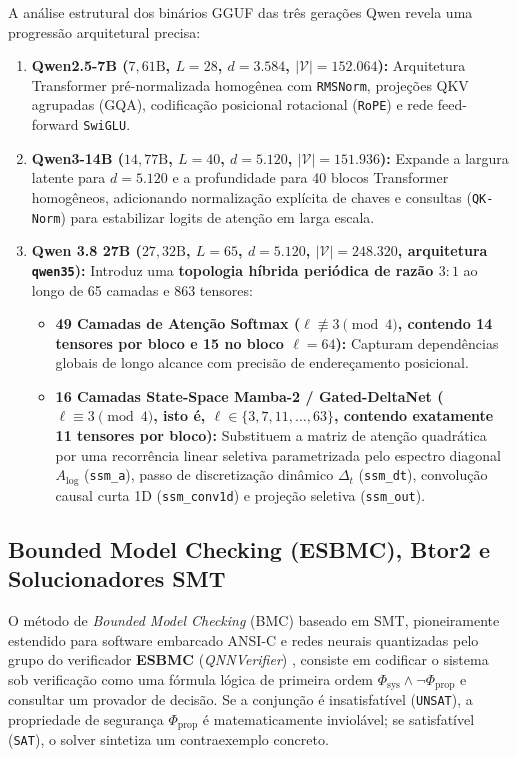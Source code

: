 \documentclass[11pt,a4paper]{article}
\theoremstyle{definition}
\begin{document}
A análise estrutural dos binários GGUF das três gerações Qwen revela uma progressão arquitetural precisa:
\begin{enumerate}
    \item \textbf{Qwen2.5-7B ($7{,}61\text{B}$, $L=28$, $d=3.584$, $|\mathcal{V}|=152.064$):} Arquitetura Transformer pré-normalizada homogênea com \texttt{RMSNorm}, projeções QKV agrupadas (GQA), codificação posicional rotacional (\texttt{RoPE}) e rede feed-forward \texttt{SwiGLU}.
    \item \textbf{Qwen3-14B ($14{,}77\text{B}$, $L=40$, $d=5.120$, $|\mathcal{V}|=151.936$):} Expande a largura latente para $d = 5.120$ e a profundidade para 40 blocos Transformer homogêneos, adicionando normalização explícita de chaves e consultas (\texttt{QK-Norm}) para estabilizar logits de atenção em larga escala.
    \item \textbf{Qwen 3.8 27B ($27{,}32\text{B}$, $L=65$, $d=5.120$, $|\mathcal{V}|=248.320$, arquitetura \texttt{qwen35}):} Introduz uma \textbf{topologia híbrida periódica de razão $3:1$} ao longo de 65 camadas e 863 tensores:
    \begin{itemize}
        \item \textbf{49 Camadas de Atenção Softmax ($\ell \not\equiv 3 \pmod 4$, contendo 14 tensores por bloco e 15 no bloco $\ell=64$):} Capturam dependências globais de longo alcance com precisão de endereçamento posicional.
        \item \textbf{16 Camadas State-Space Mamba-2 / Gated-DeltaNet ($\ell \equiv 3 \pmod 4$, isto é, $\ell \in \{3, 7, 11, \dots, 63\}$, contendo exatamente 11 tensores por bloco):} Substituem a matriz de atenção quadrática por uma recorrência linear seletiva parametrizada pelo espectro diagonal $A_{\text{log}}$ (\texttt{ssm\_a}), passo de discretização dinâmico $\Delta_t$ (\texttt{ssm\_dt}), convolução causal curta 1D (\texttt{ssm\_conv1d}) e projeção seletiva (\texttt{ssm\_out}).
    \end{itemize}
\end{enumerate}

\subsection{Bounded Model Checking (ESBMC), Btor2 e Solucionadores SMT}

O método de \textit{Bounded Model Checking} (BMC) baseado em SMT, pioneiramente estendido para software embarcado ANSI-C e redes neurais quantizadas pelo grupo do verificador \textbf{ESBMC} (\textit{QNNVerifier}) \cite{cordeiro2012,sena2019,song2022}, consiste em codificar o sistema sob verificação como uma fórmula lógica de primeira ordem $\Phi_{\text{sys}} \land \neg \Phi_{\text{prop}}$ e consultar um provador de decisão. Se a conjunção é insatisfatível (\texttt{UNSAT}), a propriedade de segurança $\Phi_{\text{prop}}$ é matematicamente inviolável; se satisfatível (\texttt{SAT}), o solver sintetiza um contraexemplo concreto.
\end{document}
